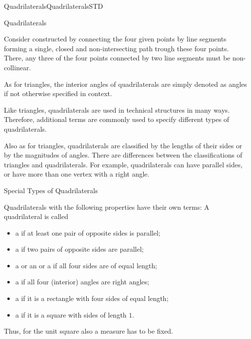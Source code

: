 \begin{MXContent}{Quadrilaterals}{Quadrilaterals}{STD}
\begin{MXInfo}{Quadrilaterals}%

Consider  constructed by connecting the 
four given points by line segments forming a single, closed and 
non-intersecting path trough these four points. There, any three of 
the four points connected by two line segments must be non-collinear. 

As for triangles, the interior angles of quadrilaterals are simply denoted 
as angles if not otherwise specified in context.
\end{MXInfo}

Like triangles, quadrilaterals are used in technical structures in many
ways. Therefore, additional terms are commonly used to specify different types of quadrilaterals. 

Also as for triangles, quadrilaterals are classified by the lengths of their 
sides or by the magnitudes of angles. There are differences between the classifications of triangles and quadrilaterals. For example, quadrilaterals can have parallel sides, or have more than one vertex with a right angle. 

\begin{MXInfo}{Special Types of Quadrilaterals}%

Quadrilaterals with the following properties have their own terms:
A quadrilateral is called

\begin{itemize}
\item a  if at least one pair of opposite sides is parallel;
\item a  if two pairs of opposite sides are parallel;
\item a  or 
 an  or
 a  if all four sides are of equal length;
\item a  if all four (interior) angles are right angles;
\item a  if it is a rectangle with four sides  of equal length;
\item a  if it is a square with sides of length $1$.
\end{itemize}
\end{MXInfo}

Thus, for the unit square also a measure has to be fixed.


\end{MXContent}
